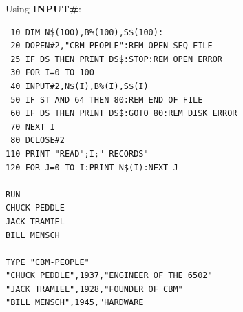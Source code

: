 \begin{description}[leftmargin=2cm,style=nextline]
\item [Example:] Using {\bf INPUT\#}:
\begin{tcolorbox}[colback=black,coltext=white]
\verbatimfont{\codefont}
\begin{verbatim}
 10 DIM N$(100),B%(100),S$(100):
 20 DOPEN#2,"CBM-PEOPLE":REM OPEN SEQ FILE
 25 IF DS THEN PRINT DS$:STOP:REM OPEN ERROR
 30 FOR I=0 TO 100
 40 INPUT#2,N$(I),B%(I),S$(I)
 50 IF ST AND 64 THEN 80:REM END OF FILE
 60 IF DS THEN PRINT DS$:GOTO 80:REM DISK ERROR
 70 NEXT I
 80 DCLOSE#2
110 PRINT "READ";I;" RECORDS"
120 FOR J=0 TO I:PRINT N$(I):NEXT J

RUN
CHUCK PEDDLE
JACK TRAMIEL
BILL MENSCH

TYPE "CBM-PEOPLE"
"CHUCK PEDDLE",1937,"ENGINEER OF THE 6502"
"JACK TRAMIEL",1928,"FOUNDER OF CBM"
"BILL MENSCH",1945,"HARDWARE

\end{verbatim}
\end{tcolorbox}
\end{description}


\newpage
